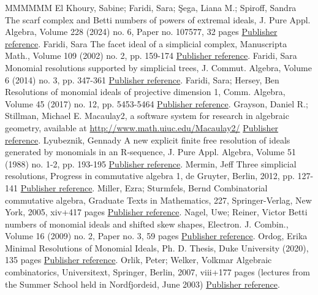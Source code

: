 \documentclass[11pt]{article}
\theoremstyle{definition}
\numberwithin{equation}{section}
\begin{document}
\begin{thebibliography}{MMMMMM}
 El Khoury, Sabine; Faridi, Sara; Şega, Liana M.; Spiroff, Sandra The scarf complex and Betti numbers of powers of extremal ideals, J. Pure Appl. Algebra, Volume 228 (2024) no. 6, Paper no. 107577, 32 pages \href{https://alco.centre-mersenne.org/articles/10.5802/alco.325/#MFO}{Publisher reference}.
 Faridi, Sara The facet ideal of a simplicial complex, Manuscripta Math., Volume 109 (2002) no. 2, pp. 159-174 \href{https://alco.centre-mersenne.org/articles/10.5802/alco.325/#F02}{Publisher reference}.
 Faridi, Sara Monomial resolutions supported by simplicial trees, J. Commut. Algebra, Volume 6 (2014) no. 3, pp. 347-361 \href{https://alco.centre-mersenne.org/articles/10.5802/alco.325/#F14}{Publisher reference}.
 Faridi, Sara; Hersey, Ben Resolutions of monomial ideals of projective dimension 1, Comm. Algebra, Volume 45 (2017) no. 12, pp. 5453-5464 \href{https://alco.centre-mersenne.org/articles/10.5802/alco.325/#FH}{Publisher reference}.
 Grayson, Daniel R.; Stillman, Michael E. Macaulay2, a software system for research in algebraic geometry, available at \url{http://www.math.uiuc.edu/Macaulay2/} \href{https://alco.centre-mersenne.org/articles/10.5802/alco.325/#M2}{Publisher reference}.
 Lyubeznik, Gennady A new explicit finite free resolution of ideals generated by monomials in an R-sequence, J. Pure Appl. Algebra, Volume 51 (1988) no. 1-2, pp. 193-195 \href{https://alco.centre-mersenne.org/articles/10.5802/alco.325/#L}{Publisher reference}.
 Mermin, Jeff Three simplicial resolutions, Progress in commutative algebra 1, de Gruyter, Berlin, 2012, pp. 127-141 \href{https://alco.centre-mersenne.org/articles/10.5802/alco.325/#M}{Publisher reference}.
 Miller, Ezra; Sturmfels, Bernd Combinatorial commutative algebra, Graduate Texts in Mathematics, 227, Springer-Verlag, New York, 2005, xiv+417 pages \href{https://alco.centre-mersenne.org/articles/10.5802/alco.325/#MS}{Publisher reference}.
 Nagel, Uwe; Reiner, Victor Betti numbers of monomial ideals and shifted skew shapes, Electron. J. Combin., Volume 16 (2009) no. 2, Paper no. 3, 59 pages \href{https://alco.centre-mersenne.org/articles/10.5802/alco.325/#NR}{Publisher reference}.
 Ordog, Erika Minimal Resolutions of Monomial Ideals, Ph. D. Thesis, Duke University (2020), 135 pages \href{https://alco.centre-mersenne.org/articles/10.5802/alco.325/#EMO}{Publisher reference}.
 Orlik, Peter; Welker, Volkmar Algebraic combinatorics, Universitext, Springer, Berlin, 2007, viii+177 pages (lectures from the Summer School held in Nordfjordeid, June 2003) \href{https://alco.centre-mersenne.org/articles/10.5802/alco.325/#OW}{Publisher reference}.

\end{thebibliography}
\end{document}
